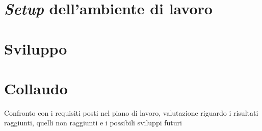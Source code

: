 

\section{\textit{Setup} dell'ambiente di lavoro}


\section{Sviluppo}


\section{Collaudo}

Confronto con i requisiti posti nel piano di lavoro, valutazione riguardo i risultati raggiunti, quelli non raggiunti e i possibili sviluppi futuri

